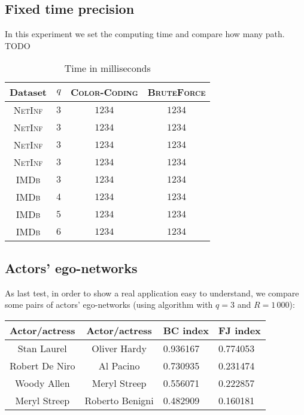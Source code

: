 	\subsection*{Fixed time precision}
	
	In this experiment we set the computing time and compare how many path.\\
	
	TODO
	\begin{table}[h]
		\centering
		\label{my-label}
		\begin{tabular}{|c|c|c|c|}
			\hline
			Dataset 		& $q$ & \textsc{Color-Coding} 	& \textsc{BruteForce} \\ \hline
			\textsc{NetInf}	& $3$ & $1234$					& $1234$ \\ \hline
			\textsc{NetInf}	& $3$ & $1234$					& $1234$ \\ \hline
			\textsc{NetInf}	& $3$ & $1234$					& $1234$ \\ \hline
			\textsc{NetInf}	& $3$ & $1234$					& $1234$ \\ \hline
			\textsc{IMDb}	& $3$ & $1234$					& $1234$ \\ \hline
			\textsc{IMDb}	& $4$ & $1234$					& $1234$ \\ \hline
			\textsc{IMDb}	& $5$ & $1234$					& $1234$ \\ \hline
			\textsc{IMDb}	& $6$ & $1234$					& $1234$ \\ \hline
		\end{tabular}
		\caption{Time in milliseconds}
	\end{table}

	\subsection*{Actors' ego-networks}
	
	As last test, in order to show a real application easy to understand, we compare
	some pairs of actors' ego-networks (using \fcount algorithm with $q=3$ and $R=1\,000$):
	
	\begin{table}[h]
		\centering
		\begin{tabular}{c|c|l|l}
			Actor/actress & Actor/actress & BC index & FJ index\\ 
			\hline
			Stan Laurel & Oliver Hardy & 0.936167 & 0.774053 \\
			Robert De Niro & Al Pacino & 0.730935 & 0.231474\\
			Woody Allen & Meryl Streep & 0.556071 & 0.222857\\
			Meryl Streep & Roberto Benigni & 0.482909 & 0.160181\\
		\end{tabular}
	\end{table}


